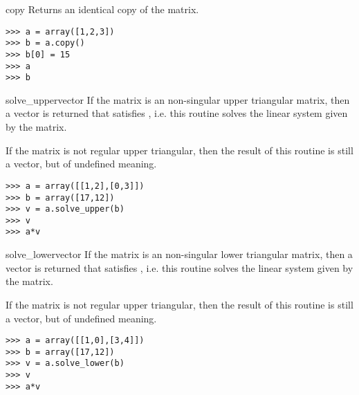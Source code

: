 \begin{methoddesc}{copy}{}
  Returns an identical copy of the matrix.
\begin{verbatim}
>>> a = array([1,2,3])
>>> b = a.copy()
>>> b[0] = 15
>>> a
>>> b
\end{verbatim}
\end{methoddesc}
\begin{methoddesc}{solve_upper}{vector}
  If the matrix is an non-singular upper triangular matrix, then a vector
   is returned that satisfies , i.e.
  this routine solves the linear system given by the matrix.

  If the matrix is not regular upper triangular, then the result of this routine
  is still a vector, but of undefined meaning.
\begin{verbatim}
>>> a = array([[1,2],[0,3]])
>>> b = array([17,12])
>>> v = a.solve_upper(b)
>>> v
>>> a*v
\end{verbatim}
\end{methoddesc}
\begin{methoddesc}{solve_lower}{vector}
  If the matrix is an non-singular lower triangular matrix, then a vector
   is returned that satisfies , i.e.
  this routine solves the linear system given by the matrix.

  If the matrix is not regular upper triangular, then the result of this routine
  is still a vector, but of undefined meaning.
  
\begin{verbatim}
>>> a = array([[1,0],[3,4]])
>>> b = array([17,12])
>>> v = a.solve_lower(b)
>>> v
>>> a*v
\end{verbatim}
\end{methoddesc}

